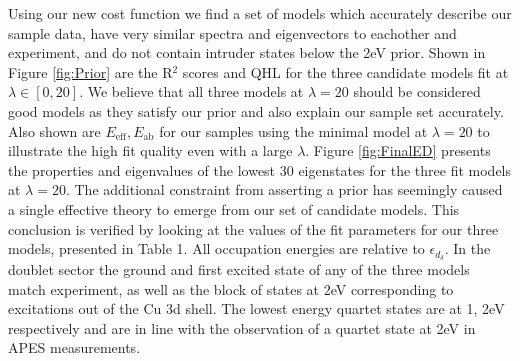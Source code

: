 \documentclass[12pt]{article}
\begin{document}
Using our new cost function we find a set of models which accurately describe our sample data, have very similar spectra and eigenvectors to eachother and experiment, and do not contain intruder states below the 2eV prior. 
Shown in Figure \ref{fig:Prior} are the R$^2$ scores and QHL for the three candidate models fit at $\lambda \in [0,20]$. 
We believe that all three models at $\lambda = 20$ should be considered good models as they satisfy our prior and also explain our sample set accurately. 
Also shown are $E_\text{eff}, E_\text{ab}$ for our samples using the minimal model at $\lambda = 20$ to illustrate the high fit quality even with a large $\lambda$.
Figure \ref{fig:FinalED} presents the properties and eigenvalues of the lowest 30 eigenstates for the three fit models at $\lambda = 20$. 
The additional constraint from asserting a prior has seemingly caused a single effective theory to emerge from our set of candidate models.
This conclusion is verified by looking at the values of the fit parameters for our three models, presented in Table 1.
All occupation energies are relative to $\epsilon_{d_\delta}$.
In the doublet sector the ground and first excited state of any of the three models match experiment, as well as the block of states at 2eV corresponding to excitations out of the Cu 3d shell.
The lowest energy quartet states are at 1, 2eV respectively and are in line with the observation of a quartet state at 2eV in APES measurements.
\end{document}
